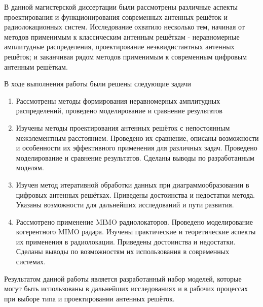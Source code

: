 \label{chap:conclusions}

В данной магистерской диссертации были рассмотрены различные аспекты проектирования и функционирования современных 
антенных решёток и радиолокационных систем. Исследование охватило несколько тем, начиная от методов 
применимым к классическим антенным решёткам - неравномерные амплитудные распределения, 
проектирование неэквидистантных антенных решёток; 
и заканчивая рядом методов применимым к современным цифровым антенным решёткам. 

В ходе выполнения работы были решены следующие задачи

\begin{enumerate}
    \item Рассмотрены методы формирования неравномерных амплитудных распределений, 
    проведено моделирование и сравнение результатов
    \item Изучены методы проектирования антенных решёток с непостоянным межэлементным расстоянием. 
    Проведено их сравнение, описаны возможности и особенности их эффективного применения для различных задач. 
    Проведено моделирование и сравнение результатов. Сделаны выводы по разработанным моделям.
    \item Изучен метод итеративной обработки данных при диаграммообразовании в цифровых антенных решётках. 
    Приведены достоинства и недостатки метода. 
    Указаны возможности для дальнейших исследований и пути развития.
    \item Рассмотрено применение MIMO радиолокаторов. 
    Проведено моделирование когерентного MIMO радара. 
    Изучены практические и теоретические аспекты их применения в радиолокации. 
    Приведены достоинства и недостатки. 
    Сделаны выводы по возможностям их использования в современных системах.
\end{enumerate}

Результатом данной работы является разработанный набор моделей, 
которые могут быть использованы в дальнейших исследованиях и в рабочих процессах 
при выборе типа и проектировании антенных решёток. 


